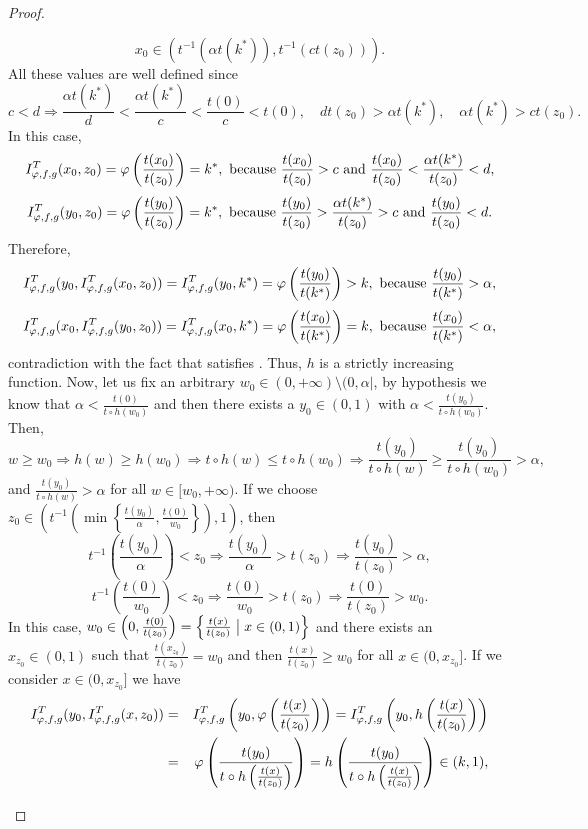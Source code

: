 \begin{proof}
\begin{itemize}
		$$ x_0 \in (t^{-1}(\alpha t(k^*)),t^{-1}(ct(z_0))).$$
		All these values are well defined since
		$$c<d \Rightarrow \frac{\alpha t(k^*)}{d} < \frac{\alpha t(k^*)}{c}< \frac{t(0)}{c} < t(0), \quad dt(z_0) > \alpha t(k^*), \quad \alpha t(k^*) > ct(z_0).$$
		In this case,
		$$I^T_{\varphi,f,g}(x_0,z_0) = \varphi \left(\frac{t(x_0)}{t(z_0)}\right) = k^*, \text{ because } \frac{t(x_0)}{t(z_0)}>c \text{ and } \frac{t(x_0)}{t(z_0)} < \frac{\alpha t(k^*)}{t(z_0)}<d,$$
		$$I^T_{\varphi,f,g}(y_0,z_0)=\varphi \left(\frac{t(y_0)}{t(z_0)}\right)=k^*, \text{ because } \frac{t(y_0)}{t(z_0)} > \frac{\alpha t(k^*)}{t(z_0)} > c \text{ and } \frac{t(y_0)}{t(z_0)} < d.$$
		Therefore,
		$$I^T_{\varphi,f,g}(y_0,I^T_{\varphi,f,g}(x_0,z_0)) = I^T_{\varphi,f,g}(y_0,k^*) = \varphi \left(\frac{t(y_0)}{t(k^*)}\right) > k,  \text{ because } \frac{t(y_0)}{t(k^*)}>\alpha,$$
		$$I^T_{\varphi,f,g}(x_0,I^T_{\varphi,f,g}(y_0,z_0)) = I^T_{\varphi,f,g}(x_0,k^*) = \varphi \left( \frac{t(x_0)}{t(k^*)} \right)=k, \text{ because } \frac{t(x_0)}{t(k^*)}< \alpha,$$
		contradiction with the fact that \IT satisfies \EP. Thus, $h$ is a strictly increasing function. Now, let us fix an arbitrary $w_0 \in (0,+\infty) \setminus (0,\alpha|$, by hypothesis we know that  $\alpha < \frac{t(0)}{t \circ h(w_0)}$ and then there exists a $y_0 \in (0,1)$ with $\alpha < \frac{t(y_0)}{t \circ h(w_0)}$. Then,
		$$w \geq w_0 \Rightarrow h(w) \geq h(w_0) \Rightarrow t \circ h(w) \leq t \circ h(w_0) \Rightarrow  \frac{t(y_0)}{t \circ h(w)} \geq \frac{t(y_0)}{t \circ h(w_0)}>\alpha,$$
		and $\frac{t(y_0)}{t \circ h(w)} > \alpha$ for all $w \in [w_0,+\infty)$. If we choose $z_0 \in \left(t^{-1}\left(\min \left \{\frac{t(y_0)}{\alpha},\frac{t(0)}{w_0}\right \} \right),1\right)$, then
		$$t^{-1} \left(\frac{t(y_0)}{\alpha}\right) < z_0 \Rightarrow \frac{t(y_0)}{\alpha} > t(z_0) \Rightarrow \frac{t(y_0)}{t(z_0)} > \alpha,$$
		$$ t^{-1} \left(\frac{t(0)}{w_0}\right) < z_0 \Rightarrow \frac{t(0)}{w_0} > t(z_0) \Rightarrow \frac{t(0)}{t(z_0)}>w_0.$$
		In this case, $w_0 \in \left(0,\frac{t(0)}{t(z_0)}\right)=\left \{ \frac{t(x)}{t(z_0)} \bigm| x \in (0,1)\right \}$ and there exists an $x_{z_0} \in (0,1)$ such that $\frac{t(x_{z_0})}{t(z_0)}=w_0$ and then $\frac{t(x)}{t(z_0)} \geq w_0$ for all $x \in (0,x_{z_0}]$. If we consider $x \in (0,x_{z_0}]$ we have
		\begin{eqnarray*}
			\IT(y_0,\IT(x,z_0))&=&\IT \left(y_0, \varphi \left(\frac{t(x)}{t(z_0)}\right)\right) = \IT \left(y_0,h \left(\frac{t(x)}{t(z_0)}\right)\right) \\
			&=& \varphi \left(\frac{t(y_0)}{t \circ h \left(\frac{t(x)}{t(z_0)}\right)}\right) = h \left(\frac{t(y_0)}{t \circ h \left(\frac{t(x)}{t(z_0)}\right)}\right) \in (k,1),

\end{eqnarray*}
\end{itemize}
\end{proof}
